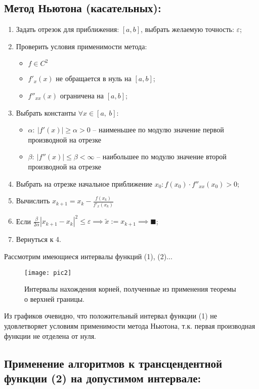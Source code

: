 \subsection{Метод  Ньютона (касательных):}
\begin{enumerate}
    \item Задать отрезок для приближения: $[a, b]$, выбрать желаемую точность: $\varepsilon$;
    \item Проверить условия применимости метода:
        \begin{itemize}
            \item $f \in C^2$
            \item $f'_x(x)$ не обращается в нуль на $[a, b]$;
            \item $f''_{xx}(x)$ ограничена на $[a, b]$;
        \end{itemize}
    \item Выбрать константы $\forall x \in [a,~ b]$:
        \begin{itemize}
            \item $\alpha: ~ |f'(x)|\ge\alpha>0$ -- наименьшее по модулю значение первой производной на отрезке
            \item $\beta: ~ |f''(x)|\le\beta<\infty$  -- наибольшее по модулю значение второй производной на отрезке
        \end{itemize}
    \item Выбрать на отрезке начальное приближение $x_0: f(x_0)\cdot f''_{xx}(x_0) > 0$;
    \item Вычислить $x_{k+1}=x_k-\frac{f(x_k)}{f'_x(x_k)}$
    \item Если $\frac{\beta}{2\alpha}|x_{k+1}-x_k|^2\le\varepsilon
    \implies \widetilde{x}:=x_{k+1}\implies\blacksquare$;
    \item Вернуться к 4.
\end{enumerate}
Рассмотрим имеющиеся интервалы функций (1), (2)...
\begin{figure}[H]
    \centering
    \caption{Интервалы нахождения корней, полученные из применения теоремы о верхней границы.}
    \label{fig:pic2}
    \texttt{[image: pic2]}
\end{figure}
Из графиков очевидно, что положительный интервал функции (1) не удовлетворяет условиям применимости метода Ньютона, т.к. первая производная функции не отделена от нуля.
\clearpage
\subsection{Применение алгоритмов к трансцендентной функции (2) на допустимом интервале:}
